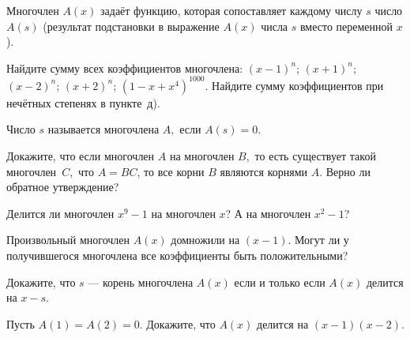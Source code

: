 \documentclass[a4paper,12pt]{article}
\newcommand{\0}[1]{\overline{#1}}
\begin{document}
\noindent





Многочлен $A(x)$ зада\"ет функцию, которая сопоставляет каждому числу $s$ %
число $A(s)$ (результат подстановки в выражение $A(x)$ числа $s$ вместо переменной $x$).

Найдите сумму всех коэффициентов многочлена:
 $(x-1)^{n}$;
 $(x+1)^{n}$;
 $(x-2)^{n}$;
 $(x+2)^{n}$;
 $(1-x+x^4)^{1000}.$
 Найдите сумму коэффициентов при неч\"етных степенях
в пункте~д).






Число  $s$  называется  многочлена  $A,$  если  $A(s)=0.$


 Докажите, что если многочлен $A$  на многочлен $B,$
то есть существует такой многочлен~$C,$ что $A=BC$, то
все корни $B$ являются корнями $A.$ Верно ли
обратное утверждение?

 Делится ли многочлен $x^9-1$ на многочлен $x$?
А на многочлен $x^2-1$?

  Произвольный многочлен $A(x)$ домножили на $(x-1)$. Могут ли у
получившегося многочлена все коэффициенты быть положительными?

Докажите, что $s$ --- корень многочлена $A(x)$
если и только если $A(x)$ делится на $x-s$.


 Пусть $A(1)=A(2)=0.$  Докажите, что  $A(x)$ делится на $(x-1)(x-2).$
\end{document}

